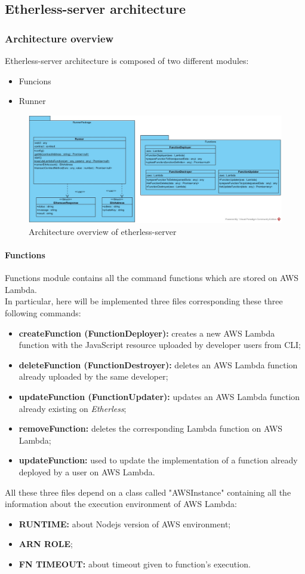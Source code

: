 \subsection{Etherless-server architecture}
\subsubsection{Architecture overview}
Etherless-server architecture is composed of two different modules:
\begin{itemize}
	\item Funcions
	\item Runner
\end{itemize}
\begin{figure}[!h]
\centering
	\includegraphics[width=\textwidth]{res/img/etherlessServer.jpg}
	\caption{Architecture overview of etherless-server}
\end{figure}
\paragraph{Functions}
Functions module contains all the command functions which are stored on AWS Lambda. \\
In particular, here will be implemented three files corresponding these three following commands:
\begin{itemize}
	\item \textbf{createFunction (FunctionDeployer):} creates a new AWS Lambda function with the JavaScript resource uploaded by developer users from CLI\glo;
	\item \textbf{deleteFunction (FunctionDestroyer):} deletes an AWS Lambda function already uploaded by the same developer;
	\item \textbf{updateFunction (FunctionUpdater):} updates an AWS Lambda function already existing on \textit{Etherless};
	\item \textbf{removeFunction:} deletes the corresponding Lambda function on AWS Lambda;
	\item \textbf{updateFunction:} used to update the implementation of a function already deployed by a user on AWS Lambda.
\end{itemize}
All these three files depend on a class called "AWSInstance" containing all the information about the execution environment of AWS Lambda:
\begin{itemize}
	\item \textbf{RUNTIME:} about Nodejs version of AWS environment;
	\item \textbf{ARN ROLE};
	\item \textbf{FN TIMEOUT:} about timeout given to function's execution.
\end{itemize}

